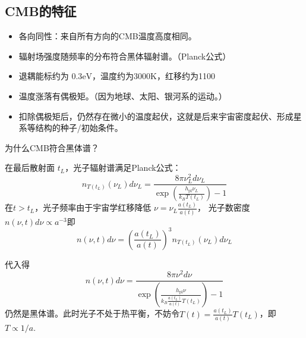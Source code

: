 \documentclass[12pt]{ctexart}
\begin{document}
\subsection{CMB的特征}

\begin{itemize}
    \item 各向同性：来自所有方向的CMB温度高度相同。
    \item 辐射场强度随频率的分布符合黑体辐射谱。（Planck公式）
    \item 退耦能标约为 $0.3\mathrm{eV}$，温度约为3000K，红移约为1100
    \item 温度涨落有偶极矩。（因为地球、太阳、银河系的运动。）
    \item 扣除偶极矩后，仍然存在微小的温度起伏，这就是后来宇宙密度起伏、形成星系等结构的种子/初始条件。
\end{itemize}

为什么CMB符合黑体谱？

在最后散射面 $t_L$，光子辐射谱满足Planck公式：
\begin{equation}
    n_{T(t_L)}(\nu_L) d \nu_L=\frac{8 \pi \nu_L^{2} d \nu_L}{\exp \left(\frac{h_\text{pl} \nu_L}{k_{B} T(t_L)} \right)-1}
\end{equation}
在$t>t_L$，光子频率由于宇宙学红移降低 $\nu=\nu_{L} \frac{a(t_L)}{a(t)}$，
光子数密度 $n\left(\nu, t\right) d\nu \propto a^{-3}$即
\begin{equation}
    n(\nu, t) d \nu=\left(\frac{a(t_L)}{a(t)}\right)^{3} n_{T\left(t_{L}\right)}\left(\nu_{L}\right) d \nu_{L}
\end{equation}

代入得
\begin{equation}
    n(\nu, t) d \nu = \frac{8 \pi \nu^{2} d \nu}{\exp \left(\frac{h_\text{pl} \nu}{k_{B} \frac{a(t_L)}{a(t)}T(t_L)}   \right)-1}
\end{equation}
仍然是黑体谱。此时光子不处于热平衡，不妨令$T(t)=\frac{a(t_L)}{a(t)}T(t_L)$，即$T\propto 1/a$.
\end{document}
